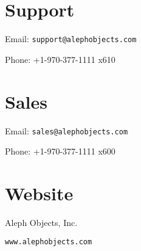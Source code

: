 %
%
%
%
%

\section{Support}
\setlength{\parindent}{0pt}
Email: \texttt{support@alephobjects.com}

Phone: +1-970-377-1111 x610

\section{Sales}

Email: \texttt{sales@alephobjects.com}

Phone: +1-970-377-1111 x600

\section{Website}

Aleph Objects, Inc.

\texttt{www.alephobjects.com}


